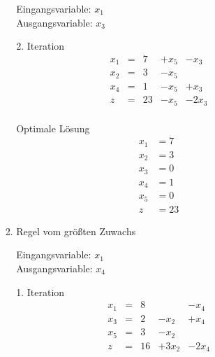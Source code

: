 \documentclass[a4paper]{scrartcl}
\begin{document}
\begin{enumerate}
\begin{enumerate}
\begin{enumerate}[(i)]
\begin{enumerate}
                                Eingangsvariable: $x_1$ \\
                                Ausgangsvariable: $x_3$

                                2. Iteration
                                \begin{equation}
                                    \begin{array}{rcrrr}
                                        x_1 & = & 7 & +x_5 & -x_3 \\
                                        x_2 & = & 3 & -x_5 &  \\
                                        x_4 & = & 1 & -x_5 & +x_3 \\
                                        \hline
                                        z   & = & 23 & -x_5 & -2x_3 \\
                                    \end{array}
                                \end{equation}

                                Optimale Lösung
                                \begin{align*}
                                    x_1 &= 7 \\
                                    x_2 &= 3 \\
                                    x_3 &= 0 \\
                                    x_4 &= 1 \\
                                    x_5 &= 0 \\
                                    z   &= 23
                                \end{align*}

                            \item Regel vom größten Zuwachs

                                Eingangsvariable: $x_1$ \\
                                Ausgangsvariable: $x_4$

                                1. Iteration
                                \begin{equation}
                                    \begin{array}{rcrrr}
                                        x_1 & = & 8 &  & -x_4 \\
                                        x_3 & = & 2 & -x_2 & +x_4 \\
                                        x_5 & = & 3 & -x_2 &  \\
                                        \hline
                                        z   & = & 16 & +3x_2 & -2x_4 \\
                                    \end{array}
                                \end{equation}


\end{enumerate}
\end{enumerate}
\end{enumerate}
\end{enumerate}
\end{document}
